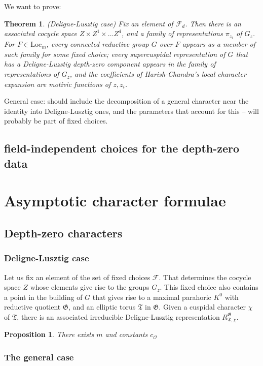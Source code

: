 \documentclass[12pt]{amsart}
\newcommand{\cF}{\mathcal{F}}
\newcommand{\cO}{\mathcal{O}}
\newcommand{\Loc}{\mathrm{Loc}}
\def\cO{\mathcal{O}}
\def\cF{\mathcal{F}}
\newcommand{\fG}{\mathfrak G}
\newcommand{\fT}{\mathfrak T}
\theoremstyle{plain}
\newtheorem{theorem}[thm]{Theorem}
\newtheorem{prop}[thm]{Proposition}
\theoremstyle{definition}
\begin{document}
We want to prove: 
\begin{theorem} (Deligne-Lusztig case) Fix an element of $\cF_d$. 
Then there is an associated cocycle space $Z\times Z^1\times \dots Z^d$, and a family of representations $\pi_{z_i}$ of $G_z$. 
For $F\in \Loc_m$, every connected reductive group $G$ over $F$ appears as a member  of such  family for some fixed choice; 
every supercuspidal representation of $G$ that has a Deligne-Luzstig depth-zero component 
appears in the family of representations of $G_z$, and 
the coefficients of Harish-Chandra's local character expansion are motivic functions of 
$z, z_i$. 
\end{theorem}

General case: should include the decomposition of a general character near the identity into Deligne-Lusztig ones, and the parameters that account for this -- will probably be part of fixed choices. 

\subsection{field-independent choices for the depth-zero data}




\section{Asymptotic character formulae}

\subsection{Depth-zero characters}
\subsubsection{Deligne-Lusztig case} Let us fix an element of the set of fixed choices $\cF$. 
That determines the cocycle space $Z$ whose elements give rise to the groups $G_z$. This fixed 
choice also contains a point in the building of $G$ that gives rise to a maximal parahoric  $K^0$
 with reductive quotient $\fG$, and an elliptic torus $\fT$ in $\fG$. 
Given a cuspidal character $\chi$ of $\fT$, there is an associated irreducible Deligne-Lusztig representation $R_{\fT, \chi}^\fG$. 
\begin{prop} There exists $m$ and constants $c_{\cO}$
\end{prop}

\subsubsection{The general case}
\end{document}
